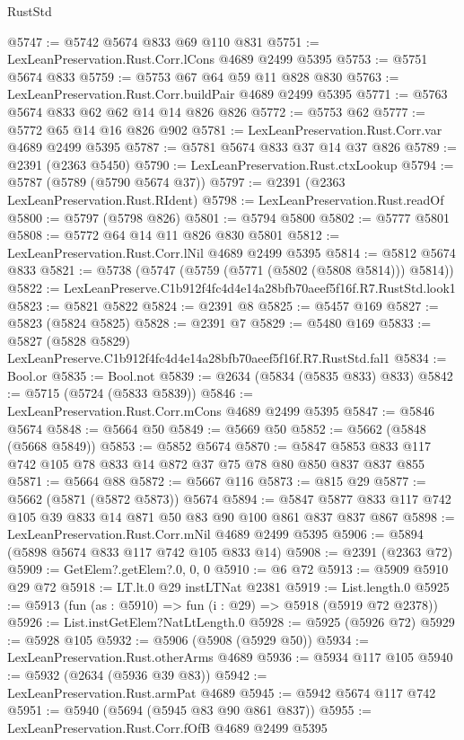 \begin{lexlean}{RustStd}
\begin{coremodule}
@5747 := @5742 @5674 @833 @69 @110 @831
@5751 := LexLeanPreservation.Rust.Corr.lCons @4689 @2499 @5395
@5753 := @5751 @5674 @833
@5759 := @5753 @67 @64 @59 @11 @828 @830
@5763 := LexLeanPreservation.Rust.Corr.buildPair @4689 @2499 @5395
@5771 := @5763 @5674 @833 @62 @62 @14 @14 @826 @826
@5772 := @5753 @62
@5777 := @5772 @65 @14 @16 @826 @902
@5781 := LexLeanPreservation.Rust.Corr.var @4689 @2499 @5395
@5787 := @5781 @5674 @833 @37 @14 @37 @826
@5789 := @2391 (@2363 @5450)
@5790 := LexLeanPreservation.Rust.ctxLookup
@5794 := @5787 (@5789 (@5790 @5674 @37))
@5797 := @2391 (@2363 LexLeanPreservation.Rust.RIdent)
@5798 := LexLeanPreservation.Rust.readOf
@5800 := @5797 (@5798 @826)
@5801 := @5794 @5800
@5802 := @5777 @5801
@5808 := @5772 @64 @14 @11 @826 @830 @5801
@5812 := LexLeanPreservation.Rust.Corr.lNil @4689 @2499 @5395
@5814 := @5812 @5674 @833
@5821 := @5738 (@5747 (@5759 (@5771 (@5802 (@5808 @5814))) @5814))
@5822 := LexLeanPreserve.C1b912f4fc4d4e14a28bfb70aeef5f16f.R7.RustStd.look1
@5823 := @5821 @5822
@5824 := @2391 @8
@5825 := @5457 @169
@5827 := @5823 (@5824 @5825)
@5828 := @2391 @7
@5829 := @5480 @169
@5833 := @5827 (@5828 @5829) LexLeanPreserve.C1b912f4fc4d4e14a28bfb70aeef5f16f.R7.RustStd.fal1
@5834 := Bool.or
@5835 := Bool.not
@5839 := @2634 (@5834 (@5835 @833) @833)
@5842 := @5715 (@5724 (@5833 @5839))
@5846 := LexLeanPreservation.Rust.Corr.mCons @4689 @2499 @5395
@5847 := @5846 @5674
@5848 := @5664 @50
@5849 := @5669 @50
@5852 := @5662 (@5848 (@5668 @5849))
@5853 := @5852 @5674
@5870 := @5847 @5853 @833 @117 @742 @105 @78 @833 @14 @872 @37 @75 @78 @80 @850 @837 @837 @855
@5871 := @5664 @88
@5872 := @5667 @116
@5873 := @815 @29
@5877 := @5662 (@5871 (@5872 @5873)) @5674
@5894 := @5847 @5877 @833 @117 @742 @105 @39 @833 @14 @871 @50 @83 @90 @100 @861 @837 @837 @867
@5898 := LexLeanPreservation.Rust.Corr.mNil @4689 @2499 @5395
@5906 := @5894 (@5898 @5674 @833 @117 @742 @105 @833 @14)
@5908 := @2391 (@2363 @72)
@5909 := GetElem?.getElem?.{0, 0, 0}
@5910 := @6 @72
@5913 := @5909 @5910 @29 @72
@5918 := LT.lt.{0} @29 instLTNat @2381
@5919 := List.length.{0}
@5925 := @5913 (fun (as : @5910) => fun (i : @29) => @5918 (@5919 @72 @2378))
@5926 := List.instGetElem?NatLtLength.{0}
@5928 := @5925 (@5926 @72)
@5929 := @5928 @105
@5932 := @5906 (@5908 (@5929 @50))
@5934 := LexLeanPreservation.Rust.otherArms @4689
@5936 := @5934 @117 @105
@5940 := @5932 (@2634 (@5936 @39 @83))
@5942 := LexLeanPreservation.Rust.armPat @4689
@5945 := @5942 @5674 @117 @742
@5951 := @5940 (@5694 (@5945 @83 @90 @861 @837))
@5955 := LexLeanPreservation.Rust.Corr.fOfB @4689 @2499 @5395

\end{coremodule}
\end{lexlean}
